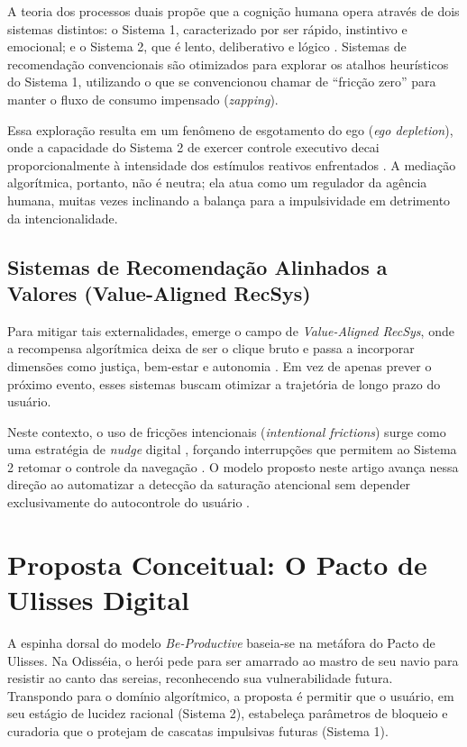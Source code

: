 A teoria dos processos duais propõe que a cognição humana opera através de dois sistemas distintos: o Sistema 1, caracterizado por ser rápido, instintivo e emocional; e o Sistema 2, que é lento, deliberativo e lógico \parencite{kahneman2011}. Sistemas de recomendação convencionais são otimizados para explorar os atalhos heurísticos do Sistema 1, utilizando o que se convencionou chamar de ``fricção zero'' para manter o fluxo de consumo impensado (\textit{zapping}). 

Essa exploração resulta em um fenômeno de esgotamento do ego (\textit{ego depletion}), onde a capacidade do Sistema 2 de exercer controle executivo decai proporcionalmente à intensidade dos estímulos reativos enfrentados \parencite{paas2023}. A mediação algorítmica, portanto, não é neutra; ela atua como um regulador da agência humana, muitas vezes inclinando a balança para a impulsividade em detrimento da intencionalidade.

\subsection{Sistemas de Recomendação Alinhados a Valores (Value-Aligned RecSys)}

Para mitigar tais externalidades, emerge o campo de \textit{Value-Aligned RecSys}, onde a recompensa algorítmica deixa de ser o clique bruto e passa a incorporar dimensões como justiça, bem-estar e autonomia \parencite{stray2021}. Em vez de apenas prever o próximo evento, esses sistemas buscam otimizar a trajetória de longo prazo do usuário. 

Neste contexto, o uso de fricções intencionais (\textit{intentional frictions}) surge como uma estratégia de \textit{nudge} digital \parencite{thaler2008}, forçando interrupções que permitem ao Sistema 2 retomar o controle da navegação \parencite{kushlev2022}. O modelo proposto neste artigo avança nessa direção ao automatizar a detecção da saturação atencional sem depender exclusivamente do autocontrole do usuário \parencite{lyngs2019}.

\section{Proposta Conceitual: O Pacto de Ulisses Digital}

A espinha dorsal do modelo \textit{Be-Productive} baseia-se na metáfora do Pacto de Ulisses. Na Odisséia, o herói pede para ser amarrado ao mastro de seu navio para resistir ao canto das sereias, reconhecendo sua vulnerabilidade futura. Transpondo para o domínio algorítmico, a proposta é permitir que o usuário, em seu estágio de lucidez racional (Sistema 2), estabeleça parâmetros de bloqueio e curadoria que o protejam de cascatas impulsivas futuras (Sistema 1).


